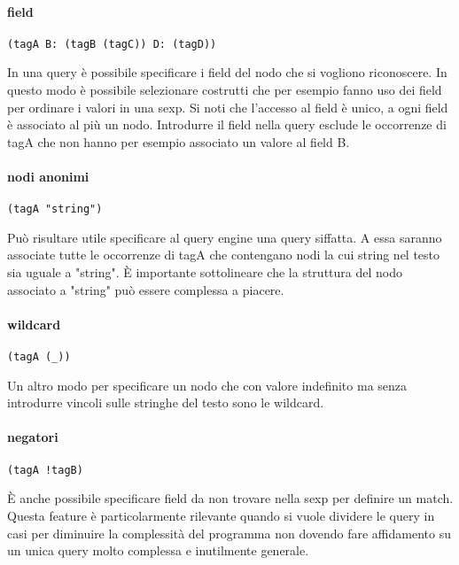 \paragraph{field}

\begin{lstlisting}
(tagA B: (tagB (tagC)) D: (tagD))
\end{lstlisting}

In una query \`e possibile specificare i field del nodo che si vogliono riconoscere.
In questo modo \`e possibile selezionare costrutti che per esempio fanno uso dei field per ordinare i valori in una sexp.
Si noti che l'accesso al field \`e unico, a ogni field \`e associato al pi\`u un nodo.
Introdurre il field nella query esclude le occorrenze di tagA che non hanno per esempio associato un valore al field B.

\paragraph{nodi anonimi}

\begin{lstlisting}
(tagA "string")
\end{lstlisting}

Pu\`o risultare utile specificare al query engine una query siffatta.
A essa saranno associate tutte le occorrenze di tagA che contengano nodi la cui string nel testo sia uguale a "string".
\`E importante sottolineare che la struttura del nodo associato a "string" pu\`o essere complessa a piacere.

\paragraph{wildcard}

\begin{lstlisting}
(tagA (_))
\end{lstlisting}

Un altro modo per specificare un nodo che con valore indefinito ma senza introdurre vincoli sulle stringhe del testo sono le wildcard.

\paragraph{negatori}

\begin{lstlisting}
(tagA !tagB)
\end{lstlisting}

\`E anche possibile specificare field da non trovare nella sexp per definire un match.
Questa feature \`e particolarmente rilevante quando si vuole dividere le query in casi per diminuire la complessit\`a del programma non dovendo fare affidamento su un unica query molto complessa e inutilmente generale.

